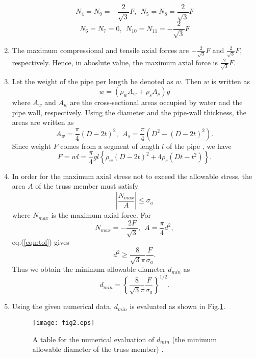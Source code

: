 \documentclass[10pt,a4j]{article}
\begin{document}
\begin{enumerate}
	\[
		N_4=N_9=-\frac{2}{\sqrt{3}}F ,\ \ N_5=N_8=\frac{2}{\sqrt{3}}F
	\]
	\[
		N_6=N_7=0, \ \ N_{10}=N_{11}=-\frac{2}{\sqrt{3}}F
	\]
\item
	The maximum compressional and tensile axial forces are $-\frac{2}{\sqrt{3}}F$ 
	and $\frac{2}{\sqrt{3}}F$, respectively. Hence, in aboslute value, the maximum axial force is $\frac{2}{\sqrt{3}}F$.
\item
	Let the weight of the pipe per length be denoted as $w$. Then $w$ is written as 
	\begin{equation}
		w= \left( \rho_w A_w + \rho_s A_\rho \right)g
		\label{eqn:}
	\end{equation}
	where $A_w$ and $A_w$ are the cross-sectional areas occupied by 
	water and the pipe wall, respectively. Using the diameter and the pipe-wall thickness, 
	the areas are written as 
	\begin{equation}
		A_w=\frac{\pi}{4}(D-2t)^2, \ \ A_s=\frac{\pi}{4}\left(D^2-(D-2t)^2\right).
		\label{eqn:}
	\end{equation}
	Since weight $F$ comes from a segment of length $l$ of the pipe , we have
	\begin{equation}
		F=wl=
		\frac{\pi}{4}gl
		\left\{ 
			\rho_w(D-2t)^2+ 4\rho_s\left(Dt-t^2\right)
		\right\}.
		\label{eqn:F_explicit}
	\end{equation}
\item
	In order for the maximum axial stress not to exceed the allowable stress, the area 
	$A$ of the truss member must satisfy 
	\begin{equation}
		\left| \frac{N_{max}}{A}\right| \leq \sigma_a
		\label{eqn:tol}
	\end{equation}
	where $N_{max}$ is the maximum axial force.
	For 
	\[ 
		N_{max}=-\frac{2F}{\sqrt{3}}, \ \ A=\frac{\pi}{4}d^2, 
	\]
	eq.(\ref{eqn:tol}) gives
	\begin{equation}
		d^2 \geq  \frac{8}{\sqrt{3}\pi} \frac{F}{\sigma_a}.
		\label{eqn:}
	\end{equation}
	Thus we obtain the minimum allowable diameter $d_{min}$ as 
	\begin{equation}
		d_{min}=
		\left\{ \frac{8}{\sqrt{3}\pi} \frac{F}{\sigma_a}
		\right\}^{1/2}.
		\label{eqn:dmin}
	\end{equation}
\item
	Using the given numerical data, $d_{min}$ is evaluated as shown in Fig.\ref{fig:fig4}.
	\begin{figure}[h]
	\begin{center}
	\texttt{[image: fig2.eps]} 
	\end{center}
	\caption{A table for the numerical evaluation of $d_{min}$ (the minimum allowable diameter of the truss member) .} 
	\label{fig:fig4}
	\end{figure}
\end{enumerate}
\end{document}
